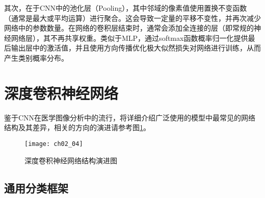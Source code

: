 其次，在于CNN中的池化层（Pooling），其中邻域的像素值使用置换不变函数（通常是最大或平均运算）进行聚合。这会导致一定量的平移不变性，并再次减少网络中的参数数量。在网络的卷积层结束时，通常会添加全连接的层（即常规的神经网络层），其不再共享权重。类似于MLP，通过softmax函数概率归一化提供最后输出层中的激活值，并且使用方向传播优化极大似然损失对网络进行训练，从而产生类别概率分布。
\section{深度卷积神经网络}
鉴于CNN在医学图像分析中的流行，将详细介绍广泛使用的模型中最常见的网络结构及其差异，相关的方向的演进请参考图\ref{fig:ch02_04}。
\begin{figure}[!htbp]
    \centering
    \texttt{[image: ch02\_04]}
    \caption{深度卷积神经网络结构演进图}
    \label{fig:ch02_04}
\end{figure}
 
\subsection{通用分类框架}

